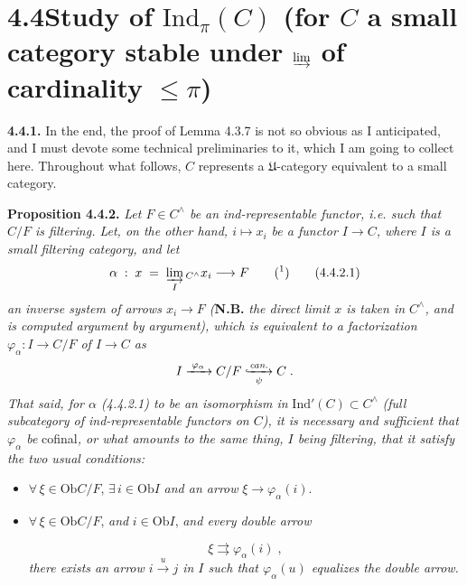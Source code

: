 \documentclass[11pt]{article}
\newcommand{\printedpage}[1]{\marginpar{\footnotesize p.~#1}}
\newcommand{\msp}[1]{\marginpar{\footnotesize [#1]}}
\newcommand{\Ind}{\mathrm{Ind}}
\newcommand{\Ob}{\mathrm{Ob}}
\newcommand{\hookxrightarrow}[2][]{\lhook\joinrel\xrightarrow[#1]{#2}}
\begin{document}
\msp{page 79}

\section*{4.4\quad Study of $\Ind_\pi(C)$ (for $C$ a small category stable under $\varinjlim$ of cardinality $\leqslant \pi$)}

\textbf{4.4.1.} In the end, the proof of Lemma 4.3.7 is not so obvious as I anticipated, and I must devote some technical preliminaries to it, which I am going to collect here. Throughout what follows, $C$ represents a $\mathfrak{U}$-category equivalent to a small category.

\printedpage{16}

\textbf{Proposition 4.4.2.} \textit{Let $F \in C^{\wedge}$ be an ind-representable functor, i.e. such that $C/F$ is filtering. Let, on the other hand, $i \longmapsto x_i$ be a functor $I \longrightarrow C$, where $I$ is a small filtering category, and let}
\[
\alpha \;:\; x \;=\; \varinjlim_{I}{}_{C^{\wedge}} x_i \longrightarrow F \qquad \text{(\footnotemark)} \tag*{(4.4.2.1)}
\]
\textit{an inverse system of arrows $x_i \longrightarrow F$ (}\textbf{N.B.} \textit{the direct limit $x$ is taken in $C^{\wedge}$, and is computed argument by argument), which is equivalent to a factorization $\varphi_\alpha : I \longrightarrow C/F$ of $I \longrightarrow C$ as}
\[
I \xrightarrow{\;\varphi_\alpha\;} C/F \hookxrightarrow[\psi]{\textit{can.}} C \;.
\]
\textit{That said, for $\alpha$ (4.4.2.1) to be an isomorphism in} $\Ind'(C) \subset C^{\wedge}$ \textit{(full subcategory of ind-representable functors on $C$), it is necessary and sufficient that $\varphi_\alpha$ be} cofinal\textit{, or what amounts to the same thing, $I$ being filtering, that it satisfy the two usual conditions:}
\begin{itemize}[leftmargin=2.5em]
\item[F\,1)] $\forall\, \xi \in \Ob C/F$, $\exists\, i \in \Ob I$ \textit{and an arrow} $\xi \longrightarrow \varphi_\alpha(i)$.
\item[F\,2)] $\forall\, \xi \in \Ob C/F$, \textit{and} $i \in \Ob I$, \textit{and every double arrow}

\msp{page 80}
\[
\xi \rightrightarrows \varphi_\alpha(i) \;,
\]
\textit{there exists an arrow $i \xrightarrow{\;u\;} j$ in $I$ such that $\varphi_\alpha(u)$ equalizes the double arrow.}
\end{itemize}
\end{document}
